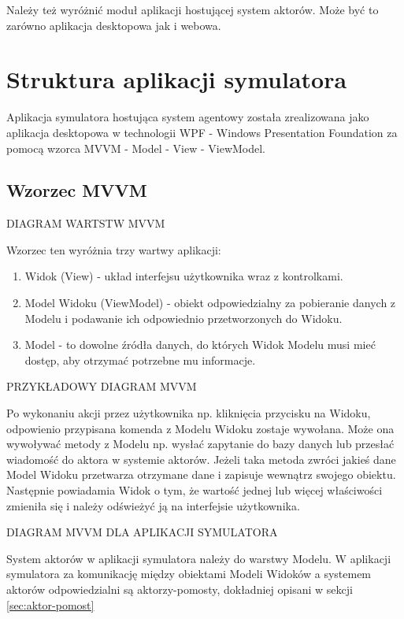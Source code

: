 Należy też wyróżnić moduł aplikacji hostującej system aktorów. 
Może być to zarówno aplikacja desktopowa jak i webowa. 

\section{Struktura aplikacji symulatora}
Aplikacja symulatora hostująca system agentowy została zrealizowana jako aplikacja desktopowa w technologii WPF - Windows Presentation Foundation za pomocą wzorca MVVM - Model - View - ViewModel.
\subsection{Wzorzec MVVM}
DIAGRAM WARTSTW MVVM
% 

Wzorzec ten wyróżnia trzy wartwy aplikacji:
\begin{enumerate}
    \item Widok (View) - układ interfejsu użytkownika wraz z kontrolkami. 
    \item Model Widoku (ViewModel) - obiekt odpowiedzialny za pobieranie danych z Modelu i podawanie ich odpowiednio przetworzonych do Widoku. 
    \item Model - to dowolne źródła danych, do których Widok Modelu musi mieć dostęp, aby otrzymać potrzebne mu informacje. 
\end{enumerate}

PRZYKŁADOWY DIAGRAM MVVM
% 

Po wykonaniu akcji przez użytkownika np. kliknięcia przycisku na Widoku, odpowienio przypisana komenda z Modelu Widoku zostaje wywołana. 
Może ona wywoływać metody z Modelu np. wysłać zapytanie do bazy danych lub przesłać wiadomość do aktora w systemie aktorów.
Jeżeli taka metoda zwróci jakieś dane Model Widoku przetwarza otrzymane dane i zapisuje wewnątrz swojego obiektu. 
Następnie powiadamia Widok o tym, że wartość jednej lub więcej właściwości zmieniła się i należy odświeżyć ją na interfejsie użytkownika.

DIAGRAM MVVM DLA APLIKACJI SYMULATORA
% 

System aktorów w aplikacji symulatora należy do warstwy Modelu.
W aplikacji symulatora za komunikację między obiektami Modeli Widoków a systemem aktorów odpowiedzialni są aktorzy-pomosty, dokładniej opisani w sekcji \ref{sec:aktor-pomost}
